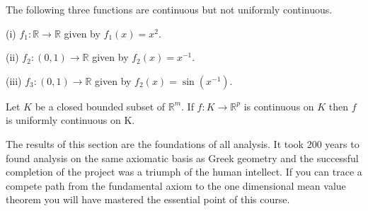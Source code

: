 \begin{example} The following three functions are continuous
but not uniformly continuous.

(i) $f_{1}:{\mathbb R}\rightarrow{\mathbb R}$ given by
$f_{1}(x)=x^{2}$.

(ii) $f_{2}:(0,1)\rightarrow{\mathbb R}$ given by
$f_{2}(x)=x^{-1}$.

(iii) $f_{3}:(0,1)\rightarrow{\mathbb R}$ given by
$f_{2}(x)=\sin(x^{-1})$.
\end{example}
\begin{theorem}\label{uniform continuity}
Let $K$ be a closed bounded subset of
${\mathbb  R}^{m}$. If $f:K\rightarrow {\mathbb  R}^{p}$
is continuous on $K$ then $f$ is uniformly continuous
on K.
\end{theorem}

The results of this section are the foundations of all
analysis. It took 200 years to found analysis on the
same axiomatic basis as Greek geometry and the successful
completion of the project was a triumph of the human intellect.
If you can trace a compete path from the fundamental axiom
to the one dimensional mean value theorem you will
have mastered the essential point of this course.
